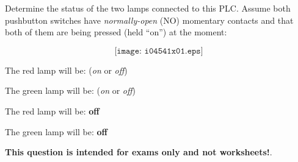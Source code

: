 

Determine the status of the two lamps connected to this PLC.  Assume both pushbutton switches have {\it normally-open} (NO) momentary contacts and that both of them are being pressed (held ``on'') at the moment:

$$\texttt{[image: i04541x01.eps]}$$

\vskip 10pt

The red lamp will be: ({\it on} or {\it off})

\vskip 10pt

The green lamp will be: ({\it on} or {\it off})







The red lamp will be: {\bf off}

\vskip 10pt

The green lamp will be: {\bf off}







{\bf This question is intended for exams only and not worksheets!}.


